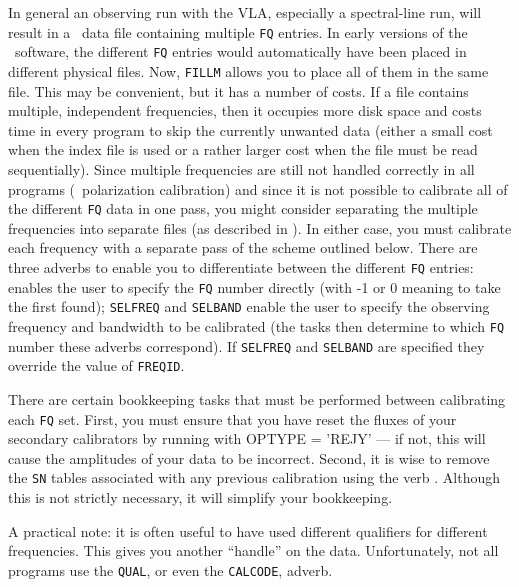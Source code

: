      In general an observing run with the VLA, especially a
spectral-line run, will result in a \uv\ data file containing multiple
{\tt FQ} entries.  In early versions of the \AIPS\
software, the different {\tt FQ} entries would automatically have been
placed in different physical files.  Now, {\tt FILLM} allows you to
place all of them in the same file.  This may be convenient, but it
has a number of costs.  If a file contains multiple, independent
frequencies, then it occupies more disk space and costs time in every
program to skip the currently unwanted data (either a small cost when
the index file is used or a rather larger cost when the file must be
read sequentially).  Since multiple frequencies are still not handled
correctly in all programs (\ie\ polarization calibration) and since it
is not possible to calibrate all of the different {\tt FQ} data in one
pass, you might consider separating the multiple frequencies into
separate files (as described in \Sec{fillm}).  In either case, you
must calibrate each frequency with a separate pass of the scheme
outlined below. There are three adverbs to enable you to differentiate
between the different {\tt FQ} entries: {\tt \tndx{FREQID}} enables
the user to specify the {\tt FQ} number directly (with -1 or 0 meaning
to take the first found); {\tt SELFREQ} and {\tt SELBAND} enable the
user to specify the observing frequency and bandwidth to be calibrated
(the tasks then determine to which {\tt FQ} number these adverbs
correspond). If {\tt SELFREQ} and {\tt SELBAND} are specified they
override the value of \hbox{{\tt FREQID}}. \todx{FQ number}

     There are certain bookkeeping tasks that must be performed
between calibrating each {\tt FQ} set.  First, you must ensure that
you have reset the fluxes of your secondary calibrators by running
{\tt \tndx{SETJY}} with {\us OPTYPE = 'REJY'} --- if not, this will
cause the amplitudes of your data to be incorrect.  Second, it is wise
to remove the {\tt SN} tables associated with any previous calibration
using the verb \hbox{{\tt \tndx{EXTDEST}}}.  Although this is not
strictly necessary, it will simplify your bookkeeping.

    A practical note: it is often useful to have used different
qualifiers for different frequencies.  This gives you another
``handle'' on the data.  Unfortunately, not all programs use the
{\tt QUAL}, or even the {\tt CALCODE}, adverb.


